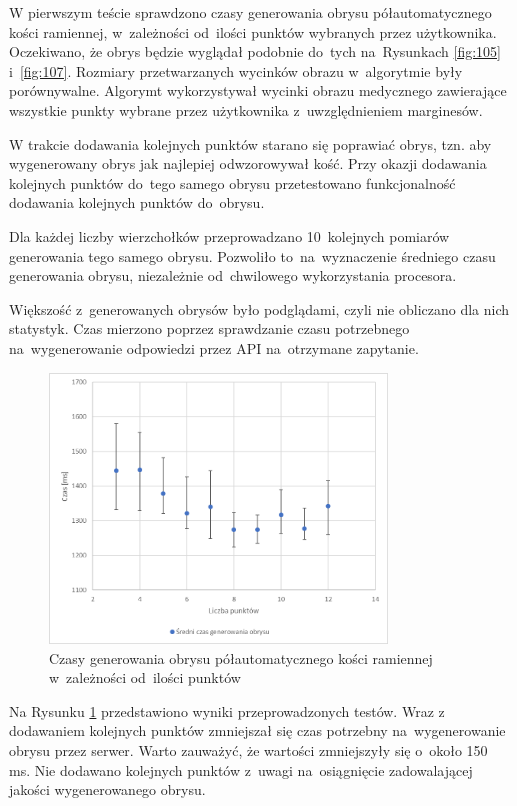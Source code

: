 \documentclass[a4paper,11pt,twoside,openright]{report}
\theoremstyle{definition}
\begin{document}
W pierwszym teście sprawdzono czasy generowania obrysu półautomatycznego kości
ramiennej, w~zależności od~ilości punktów wybranych przez użytkownika. Oczekiwano,
że obrys będzie wyglądał podobnie do~tych na~Rysunkach \ref{fig:105} i~\ref{fig:107}.
Rozmiary przetwarzanych wycinków obrazu w~algorytmie były porównywalne. Algorymt
wykorzystywał wycinki obrazu medycznego zawierające wszystkie punkty wybrane
przez użytkownika z~uwzględnieniem marginesów.

W trakcie dodawania kolejnych punktów starano się poprawiać obrys, tzn. aby
wygenerowany obrys jak najlepiej odwzorowywał kość. Przy okazji dodawania kolejnych
punktów do~tego samego obrysu przetestowano funkcjonalność dodawania kolejnych
punktów do~obrysu.

Dla każdej liczby wierzchołków przeprowadzano 10~kolejnych pomiarów generowania
tego samego obrysu. Pozwoliło to~na~wyznaczenie średniego czasu generowania obrysu,
niezależnie od~chwilowego wykorzystania procesora.

Większość z~generowanych obrysów było podglądami, czyli nie obliczano dla nich
statystyk. Czas mierzono poprzez sprawdzanie czasu potrzebnego na~wygenerowanie
odpowiedzi przez API na~otrzymane zapytanie.

\begin{figure}[h!]
	\center
	\includegraphics[width=0.8\textwidth]{testy_1}
	\caption{Czasy generowania obrysu półautomatycznego kości ramiennej w~zależności od~ilości punktów}
    	\label{fig:testy_1}
\end{figure}

Na Rysunku \ref{fig:testy_1} przedstawiono wyniki przeprowadzonych testów. Wraz
z dodawaniem kolejnych punktów zmniejszał się czas potrzebny na~wygenerowanie
obrysu przez serwer. Warto zauważyć, że wartości zmniejszyły się o~około 150 ms.
Nie dodawano kolejnych punktów z~uwagi na~osiągnięcie zadowalającej jakości
wygenerowanego obrysu.
\end{document}
